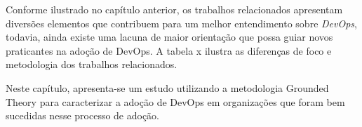 Conforme ilustrado no capítulo anterior, os trabalhos relacionados apresentam
diversões elementos que contribuem para um melhor entendimento sobre
\textit{DevOps}, todavia, ainda existe uma lacuna de maior orientação que possa
guiar novos praticantes na adoção de DevOps. A tabela x ilustra as diferenças
de foco e metodologia dos trabalhos relacionados.

Neste capítulo, apresenta-se um estudo utilizando a metodologia Grounded Theory
para caracterizar a adoção de DevOps em organizações que foram bem sucedidas
nesse processo de adoção.

